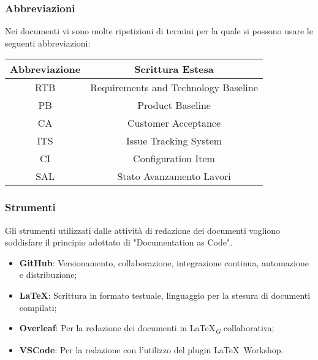 \subsubsection{Abbreviazioni}
Nei documenti vi sono molte ripetizioni di termini per la quale si possono usare le seguenti abbreviazioni:\\
\vspace{0.2cm}
\begin{tabular}{|c|c|}
    \hline
    \textbf{Abbreviazione} & \textbf{Scrittura Estesa}            \\
    \hline
    RTB                    & Requirements and Technology Baseline \\
    PB                     & Product Baseline                     \\
    CA                     & Customer Acceptance                  \\
    ITS                    & Issue Tracking System                \\
    CI                     & Configuration Item                   \\
    SAL                    & Stato Avanzamento Lavori             \\   
    \hline
\end{tabular}

\subsubsection{Strumenti}
Gli strumenti utilizzati dalle attività di redazione dei documenti vogliono soddisfare il principio adottato di "Documentation as Code".
\begin{itemize}
    \item \textbf{GitHub}: Versionamento, collaborazione, integrazione continua, automazione e distribuzione;
    \item \textbf{\LaTeX}: Scrittura in formato testuale, linguaggio per la stesura di documenti compilati;
    \item \textbf{Overleaf}: Per la redazione dei documenti in \LaTeX\textsubscript{\textit{G}} collaborativa;
    \item \textbf{VSCode}: Per la redazione con l'utilizzo del plugin \LaTeX\ Workshop.
\end{itemize}

